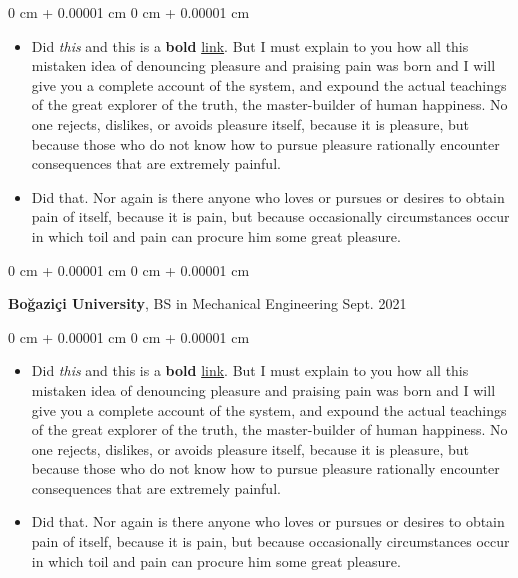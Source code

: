 \documentclass[10pt, letterpaper]{article}
\newenvironment{highlights}{
    \begin{itemize}[
        topsep=0.10 cm,
        parsep=0.10 cm,
        partopsep=0pt,
        itemsep=0pt,
        leftmargin=0 cm + 10pt
    ]
}{
    \end{itemize}
} %
\newenvironment{onecolentry}{
    \begin{adjustwidth}{
        0 cm + 0.00001 cm
    }{
        0 cm + 0.00001 cm
    }
}{
    \end{adjustwidth}
} %
\newenvironment{twocolentry}[2][]{
    \onecolentry
    \def\secondColumn{#2}
    \setcolumnwidth{\fill, 4.5 cm}
    \begin{paracol}{2}
}{
    \switchcolumn \raggedleft \secondColumn
    \end{paracol}
    \endonecolentry
} %
\begin{document}
        \vspace{0.10 cm}
        \begin{onecolentry}
            \begin{highlights}
                \item Did \textit{this} and this is a \textbf{bold} \href{https://example.com}{link}. But I must explain to you how all this mistaken idea of denouncing pleasure and praising pain was born and I will give you a complete account of the system, and expound the actual teachings of the great explorer of the truth, the master-builder of human happiness. No one rejects, dislikes, or avoids pleasure itself, because it is pleasure, but because those who do not know how to pursue pleasure rationally encounter consequences that are extremely painful.
                \item Did that. Nor again is there anyone who loves or pursues or desires to obtain pain of itself, because it is pain, but because occasionally circumstances occur in which toil and pain can procure him some great pleasure.
            \end{highlights}
        \end{onecolentry}


        \vspace{0.2 cm}

        \begin{twocolentry}{
            Sept. 2021
        }
            \textbf{Boğaziçi University}, BS in Mechanical Engineering\end{twocolentry}

        \vspace{0.10 cm}
        \begin{onecolentry}
            \begin{highlights}
                \item Did \textit{this} and this is a \textbf{bold} \href{https://example.com}{link}. But I must explain to you how all this mistaken idea of denouncing pleasure and praising pain was born and I will give you a complete account of the system, and expound the actual teachings of the great explorer of the truth, the master-builder of human happiness. No one rejects, dislikes, or avoids pleasure itself, because it is pleasure, but because those who do not know how to pursue pleasure rationally encounter consequences that are extremely painful.
                \item Did that. Nor again is there anyone who loves or pursues or desires to obtain pain of itself, because it is pain, but because occasionally circumstances occur in which toil and pain can procure him some great pleasure.
            \end{highlights}
        \end{onecolentry}
\end{document}
